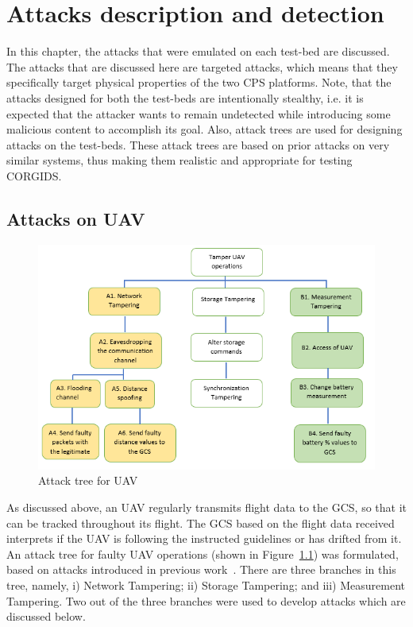 
\chapter{\textbf{Attacks description and detection}}
\label{ch:Attacks}

In this chapter, the attacks that were emulated on each test-bed are discussed. The attacks that are discussed here are  targeted attacks, which means that they specifically target physical properties of the two \ac{CPS} platforms. Note, that the attacks designed for both the test-beds are intentionally stealthy, i.e. it is expected that the attacker wants to remain undetected while introducing some malicious content to accomplish its goal. Also, attack trees are used for designing attacks on the test-beds. These attack trees are based on prior attacks on very similar systems, thus making them realistic and appropriate for testing \ac{CORGIDS}.


\section{Attacks on \ac{UAV}}

\begin{figure}[ht]
    \centering
    \includegraphics[scale=0.75,keepaspectratio = true]{Graphics/AttackTreeUAVNew.png}
    \caption{Attack tree for UAV}
    \label{fig:attackTreeUAV}
\end{figure}
As discussed above, an \ac{UAV} regularly transmits flight data to the \ac{GCS}, so that it can be tracked throughout its flight. The \ac{GCS} based on the flight data received interprets if the \ac{UAV} is following the instructed guidelines or has drifted from it. An attack tree for faulty \ac{UAV} operations (shown in Figure~\ref{fig:attackTreeUAV}) was formulated, based on attacks introduced in previous work~\cite{javaid2012cyber, mitchell2012specification}. There are three branches in this tree, namely, i) Network Tampering; ii) Storage Tampering; and iii) Measurement Tampering. Two out of the three branches were used to develop attacks which are discussed below.

